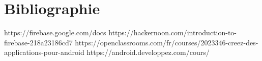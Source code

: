 \chapter*{Bibliographie}


\begin{thebibliography}{10} %

https://firebase.google.com/docs
https://hackernoon.com/introduction-to-firebase-218a23186cd7
https://openclassrooms.com/fr/courses/2023346-creez-des-applications-pour-android
https://android.developpez.com/cours/

\end{thebibliography} 